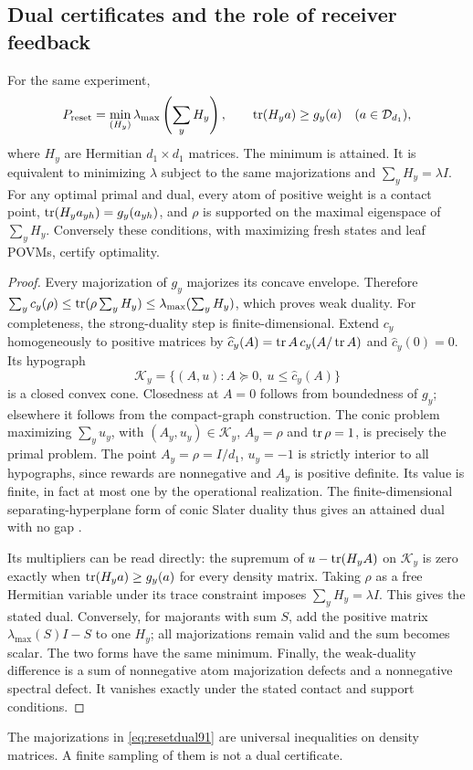 \subsection{Dual certificates and the role of receiver feedback}
\begin{theorem}\label{thm:resetdual91}
For the same experiment,
\begin{equation}\label{eq:resetdual91}
 P_{\rm reset}=\min_{(H_y)}\lambda_{\max}\left(\sum_yH_y\right),
 \qquad \operatorname{tr}(H_ya)\ge g_y(a)\quad(a\in\mathcal D_{d_1}),
\end{equation}
where $H_y$ are Hermitian $d_1\times d_1$ matrices.  The minimum is
attained.  It is equivalent to minimizing $\lambda$ subject to the
same majorizations and $\sum_yH_y=\lambda I$.
For any optimal primal and dual, every atom of positive weight is a
contact point, $\operatorname{tr}(H_ya_{yh})=g_y(a_{yh})$, and $\rho$ is supported
on the maximal eigenspace of $\sum_yH_y$.  Conversely these conditions,
with maximizing fresh states and leaf POVMs, certify optimality.
\end{theorem}
\begin{proof}
Every majorization of $g_y$ majorizes its concave envelope.  Therefore
$\sum_yc_y(\rho)\le\operatorname{tr}(\rho\sum_yH_y)\le
\lambda_{\max}(\sum_yH_y)$, which proves weak duality.
For completeness, the strong-duality step is finite-dimensional.
Extend $c_y$ homogeneously to positive matrices by
$\widehat c_y(A)=\operatorname{tr} A\,c_y(A/\operatorname{tr} A)$ and $\widehat c_y(0)=0$.
Its hypograph
\[
 \mathcal K_y=\{(A,u):A\succeq0,\ u\le\widehat c_y(A)\}
\]
is a closed convex cone.  Closedness at $A=0$ follows from boundedness
of $g_y$; elsewhere it follows from the compact-graph construction.
The conic problem maximizing $\sum_yu_y$, with $(A_y,u_y)\in\mathcal K_y$,
$A_y=\rho$ and $\operatorname{tr}\rho=1$, is precisely the primal problem.
The point $A_y=\rho=I/d_1$, $u_y=-1$ is strictly interior to all
hypographs, since rewards are nonnegative and $A_y$ is positive definite.
Its value is finite, in fact at most one by the operational realization.
The finite-dimensional separating-hyperplane form of conic Slater
duality thus gives an attained dual with no gap
\cite[Sections~5.2.3 and~5.9.1]{BV91}.

Its multipliers can be read directly: the supremum of
$u-\operatorname{tr}(H_yA)$ on $\mathcal K_y$ is zero exactly when
$\operatorname{tr}(H_ya)\ge g_y(a)$ for every density matrix.  Taking $\rho$ as a
free Hermitian variable under its trace constraint imposes
$\sum_yH_y=\lambda I$.  This gives the stated dual.  Conversely, for
majorants with sum $S$, add the positive matrix
$\lambda_{\max}(S)I-S$ to one $H_y$; all majorizations remain valid
and the sum becomes scalar.  The two forms have the same minimum.
Finally, the weak-duality difference is a sum of nonnegative atom
majorization defects and a nonnegative spectral defect.  It vanishes
exactly under the stated contact and support conditions.
\end{proof}
The majorizations in \eqref{eq:resetdual91} are universal inequalities
on density matrices.  A finite sampling of them is not a dual certificate.

